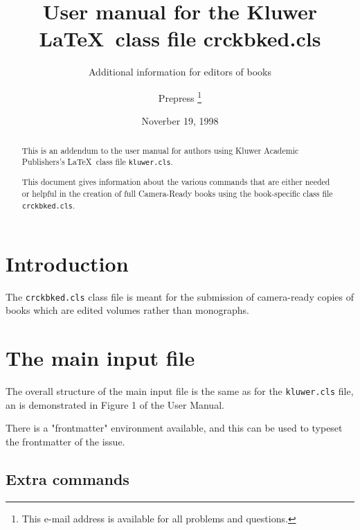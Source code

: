 \documentclass[a4paper,namedreferences]{kluwer}
\begin{document}
     
\begin{article}
\begin{opening}
\title{User manual for the Kluwer \LaTeX\ class file \hbox{crckbked.cls}}
\subtitle{Additional information for editors of books}
\author{Prepress \thanks{This
    e-mail address is available for all problems and questions.}}
\date{Noverber 19, 1998}                              
\begin{abstract}
This is an addendum to the user manual for authors using     
Kluwer Academic Publishers's \LaTeX\ class file \verb"kluwer.cls".
                              
This document gives information about the various commands
that are either needed or helpful in the creation of full
Camera-Ready books using the book-specific class file \verb'crckbked.cls'.
\end{abstract}                                                   
\end{opening}   


\section*{Introduction}
                                                     

The \verb"crckbked.cls" class file is meant for the submission of
camera-ready copies of books which are edited
volumes rather than monographs.

                          

\section*{The main input file}
                               
The overall structure of the main input file is the same as for the
\verb"kluwer.cls" file, an is demonstrated in Figure 1 of the User Manual.

There is a "frontmatter" environment available, and this can be used to
typeset the frontmatter of the issue.

\subsection*{Extra commands}

\end{article}
\end{document}
